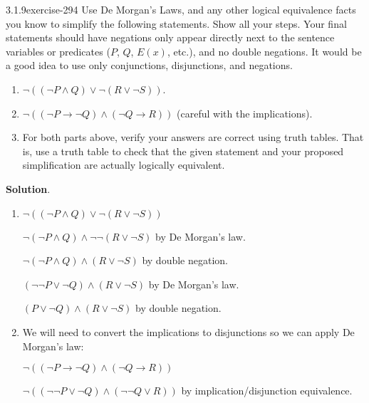 \documentclass[twoside,11pt,]{book}
\numberwithin{equation}{chapter}
\newcommand{\imp}{\rightarrow}
\begin{document}
\begin{divisionsolution}{3.1.9}{}{exercise-294}%
\hypertarget{p-3950}{}%
Use De Morgan's Laws, and any other logical equivalence facts you know to simplify the following statements. Show all your steps. Your final statements should have negations only appear directly next to the sentence variables or predicates (\(P\), \(Q\), \(E(x)\), etc.), and no double negations. It would be a good idea to use only conjunctions, disjunctions, and negations.\leavevmode%
\begin{enumerate}[label=(\alph*)]
\item\hypertarget{li-2066}{}\(\neg((\neg P \wedge Q) \vee \neg(R \vee \neg S))\).%
\item\hypertarget{li-2067}{}\(\neg((\neg P \imp \neg Q) \wedge (\neg Q \imp R))\) (careful with the implications).%
\item\hypertarget{li-2068}{}\hypertarget{p-3951}{}%
For both parts above, verify your answers are correct using truth tables. That is, use a truth table to check that the given statement and your proposed simplification are actually logically equivalent.%
\end{enumerate}
%
\par\smallskip%
\noindent\textbf{Solution}.\quad%
\hypertarget{p-3952}{}%
\leavevmode%
\begin{enumerate}[label=(\alph*)]
\item\hypertarget{li-2069}{}\hypertarget{p-3953}{}%
\(\neg((\neg P \wedge Q) \vee \neg(R \vee \neg S))\)%
\par
\hypertarget{p-3954}{}%
\(\neg(\neg P \wedge Q) \wedge \neg\neg(R \vee \neg S)\) by De Morgan's law.%
\par
\hypertarget{p-3955}{}%
\(\neg(\neg P \wedge Q) \wedge (R \vee \neg S)\) by double negation.%
\par
\hypertarget{p-3956}{}%
\((\neg\neg P \vee \neg Q) \wedge (R \vee \neg S)\) by De Morgan's law.%
\par
\hypertarget{p-3957}{}%
\((P \vee \neg Q) \wedge (R \vee \neg S)\) by double negation.%
\item\hypertarget{li-2070}{}\hypertarget{p-3958}{}%
We will need to convert the implications to disjunctions so we can apply De Morgan's law:%
\par
\hypertarget{p-3959}{}%
\(\neg((\neg P \imp \neg Q) \wedge (\neg Q \imp R))\)%
\par
\hypertarget{p-3960}{}%
\(\neg((\neg \neg P \vee \neg Q) \wedge (\neg\neg Q \vee R))\) by implication/disjunction equivalence.%
\par

\end{enumerate}
\end{divisionsolution}
\end{document}
